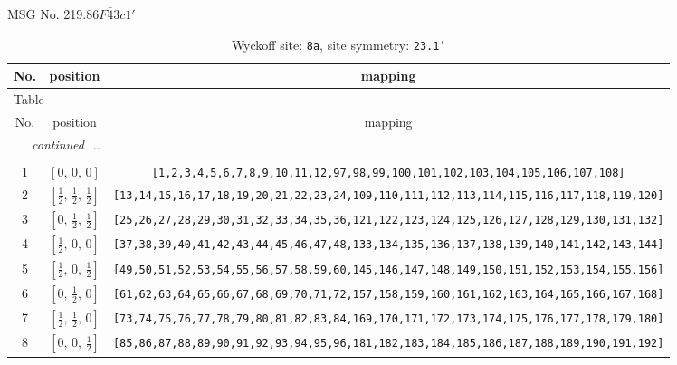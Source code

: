 \documentclass[fleqn,8pt]{jsarticle}
\begin{document}
\setcounter{MaxMatrixCols}{32}

\renewcommand{\tablename}{Table~}
\renewcommand{\figurename}{Figure~}
\begin{center}
\LARGE
MSG No. 219.86\quad$F\bar{4}3c1'$
\end{center}
\renewcommand{\arraystretch}{1.2}
\begin{longtable}{ccc}
\caption{Wyckoff site: {\tt 8a}, site symmetry: {\tt 23.1'}}
 \\
 \hline \hline
No. & position & mapping \\ \hline \endfirsthead

\multicolumn{2}{l}{\tablename\ \thetable{}} \\
 \hline \hline
No. & position & mapping \\ \hline \endhead

 \hline \hline
\multicolumn{2}{r}{\footnotesize\it continued ...} \\ \endfoot

 \hline \hline
\multicolumn{2}{r}{} \\ \endlastfoot

1 & $\left[ 0,\, 0,\, 0 \right]$ & {\tt [1,2,3,4,5,6,7,8,9,10,11,12,97,98,99,100,101,102,103,104,105,106,107,108]} \\ \hline
2 & $\left[ \frac{1}{2},\, \frac{1}{2},\, \frac{1}{2} \right]$ & {\tt [13,14,15,16,17,18,19,20,21,22,23,24,109,110,111,112,113,114,115,116,117,118,119,120]} \\ \hline
3 & $\left[ 0,\, \frac{1}{2},\, \frac{1}{2} \right]$ & {\tt [25,26,27,28,29,30,31,32,33,34,35,36,121,122,123,124,125,126,127,128,129,130,131,132]} \\ \hline
4 & $\left[ \frac{1}{2},\, 0,\, 0 \right]$ & {\tt [37,38,39,40,41,42,43,44,45,46,47,48,133,134,135,136,137,138,139,140,141,142,143,144]} \\ \hline
5 & $\left[ \frac{1}{2},\, 0,\, \frac{1}{2} \right]$ & {\tt [49,50,51,52,53,54,55,56,57,58,59,60,145,146,147,148,149,150,151,152,153,154,155,156]} \\ \hline
6 & $\left[ 0,\, \frac{1}{2},\, 0 \right]$ & {\tt [61,62,63,64,65,66,67,68,69,70,71,72,157,158,159,160,161,162,163,164,165,166,167,168]} \\ \hline
7 & $\left[ \frac{1}{2},\, \frac{1}{2},\, 0 \right]$ & {\tt [73,74,75,76,77,78,79,80,81,82,83,84,169,170,171,172,173,174,175,176,177,178,179,180]} \\ \hline
8 & $\left[ 0,\, 0,\, \frac{1}{2} \right]$ & {\tt [85,86,87,88,89,90,91,92,93,94,95,96,181,182,183,184,185,186,187,188,189,190,191,192]} \\
\end{longtable}
\end{document}
